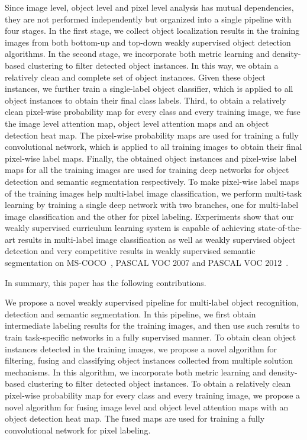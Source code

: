 \documentclass[10pt,twocolumn,letterpaper]{article}
\begin{document}
Since image level, object level and pixel level analysis has mutual dependencies, they are not performed independently but organized into a single pipeline with four stages.
In the first stage, we collect object localization results in the training images from both bottom-up and top-down weakly supervised object detection algorithms. In the second stage, we incorporate both metric learning and density-based clustering to filter detected object instances. In this way, we obtain a relatively clean and complete set of object instances. Given these object instances, we further train a single-label object classifier, which is applied to all object instances to obtain their final class labels. Third, to obtain a relatively clean pixel-wise probability map for every class and every training image, we fuse the image level attention map, object level attention maps and an object detection heat map. The pixel-wise probability maps are used for training a fully convolutional network, which is applied to all training images to obtain their final pixel-wise label maps. Finally, the obtained object instances and pixel-wise label maps for all the training images are used for training deep networks for object detection and semantic segmentation respectively. To make pixel-wise label maps of the training images help multi-label image classification, we perform multi-task learning by training a single deep network with two branches, one for multi-label image classification and the other for pixel labeling. Experiments show that our weakly supervised curriculum learning system is capable of achieving state-of-the-art results in multi-label image classification as well as weakly supervised object detection and very competitive results in weakly supervised semantic segmentation on MS-COCO~\cite{lin2014microsoft}, PASCAL VOC 2007 and PASCAL VOC 2012~\cite{everingham2010pascal}.



In summary, this paper has the following contributions.

{\flushleft } We propose a novel weakly supervised pipeline for multi-label object recognition, detection and semantic segmentation. In this pipeline, we first obtain intermediate labeling results for the training images, and then use such results to train task-specific networks in a fully supervised manner.
{\flushleft } To obtain clean object instances detected in the training images, we propose a novel algorithm for filtering, fusing and classifying object instances collected from multiple solution mechanisms. In this algorithm, we incorporate both metric learning and density-based clustering to filter detected object instances.
{\flushleft } To obtain a relatively clean pixel-wise probability map for every class and every training image, we propose a novel algorithm for fusing image level and object level attention maps with an object detection heat map. The fused maps are used for training a fully convolutional network for pixel labeling.
\end{document}
